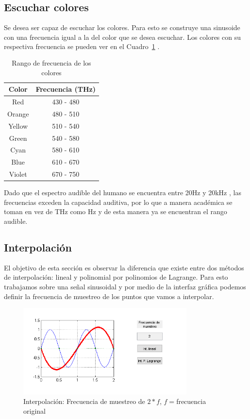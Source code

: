 \documentclass[comsoc, journal]{IEEEtran}
\begin{document}
\subsection{Escuchar colores}
Se desea ser capaz de escuchar los colores. Para esto se construye una sinusoide con una frecuencia igual a la del color que se desea escuchar. Los colores con su respectiva frecuencia se pueden ver en el Cuadro~\ref{table_color} \cite{bohren}.

\begin{table}[!t]
    \renewcommand{\arraystretch}{1.3}
    \caption{Rango de frecuencia de los colores}
    \label{table_color}
    \centering
    \begin{tabular}{|c|c|}
        \hline
        Color & Frecuencia (THz)\\
        \hline
        Red	    & 430 - 480\\
        \hline
        Orange	& 480 - 510\\
        \hline
        Yellow	& 510 - 540\\
        \hline
        Green	& 540 - 580\\
        \hline
        Cyan	& 580 - 610\\
        \hline
        Blue	& 610 - 670\\
        \hline
        Violet	& 670 - 750\\
        \hline
    \end{tabular}
\end{table}

Dado que el espectro audible del humano se encuentra entre 20Hz y 20kHz \cite{rosen}, las frecuencias exceden la capacidad auditiva, por lo que a manera académica se toman en vez de THz como Hz y de esta manera ya se encuentran el rango audible.

\subsection{Interpolación}

El objetivo de esta sección es observar la diferencia que existe entre dos métodos de interpolación: lineal y polinomial por polinomios de Lagrange. Para esto trabajamos sobre una señal sinusoidal y por medio de la interfaz gráfica podemos definir la frecuencia de muestreo de los puntos que vamos a interpolar.


\begin{figure}[!t]
\centering
\includegraphics[width=3.5in]{imgs/inter2.png}
\caption{Interpolación: Frecuencia de muestreo de $2*f$, $f=$frecuencia original}
\label{fig_inter_2}
\end{figure}
\end{document}
